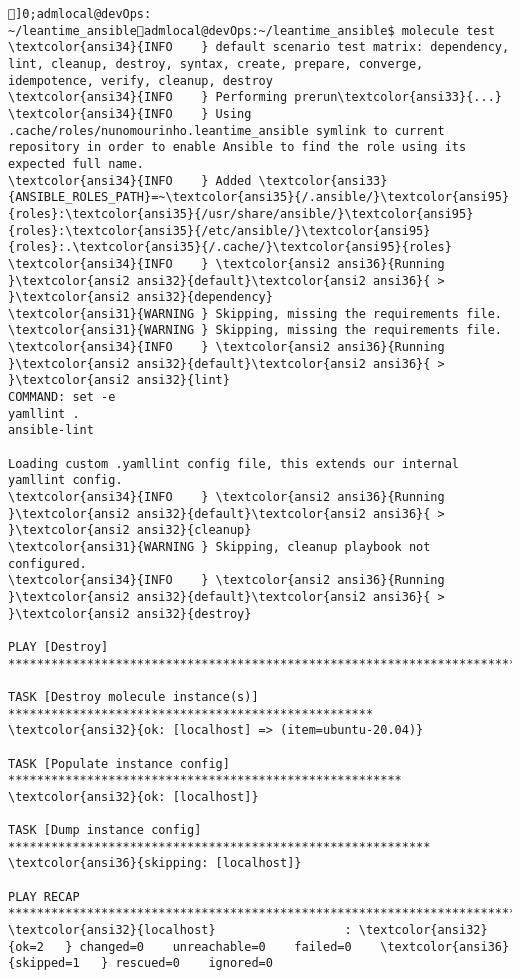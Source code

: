 \documentclass{scrartcl}
\title{}
\begin{document}
\begin{Verbatim}
]0;admlocal@devOps: ~/leantime_ansibleadmlocal@devOps:~/leantime_ansible$ molecule test
\textcolor{ansi34}{INFO    } default scenario test matrix: dependency, lint, cleanup, destroy, syntax, create, prepare, converge, idempotence, verify, cleanup, destroy
\textcolor{ansi34}{INFO    } Performing prerun\textcolor{ansi33}{...}
\textcolor{ansi34}{INFO    } Using .cache/roles/nunomourinho.leantime_ansible symlink to current repository in order to enable Ansible to find the role using its expected full name.
\textcolor{ansi34}{INFO    } Added \textcolor{ansi33}{ANSIBLE_ROLES_PATH}=~\textcolor{ansi35}{/.ansible/}\textcolor{ansi95}{roles}:\textcolor{ansi35}{/usr/share/ansible/}\textcolor{ansi95}{roles}:\textcolor{ansi35}{/etc/ansible/}\textcolor{ansi95}{roles}:.\textcolor{ansi35}{/.cache/}\textcolor{ansi95}{roles}
\textcolor{ansi34}{INFO    } \textcolor{ansi2 ansi36}{Running }\textcolor{ansi2 ansi32}{default}\textcolor{ansi2 ansi36}{ > }\textcolor{ansi2 ansi32}{dependency}
\textcolor{ansi31}{WARNING } Skipping, missing the requirements file.
\textcolor{ansi31}{WARNING } Skipping, missing the requirements file.
\textcolor{ansi34}{INFO    } \textcolor{ansi2 ansi36}{Running }\textcolor{ansi2 ansi32}{default}\textcolor{ansi2 ansi36}{ > }\textcolor{ansi2 ansi32}{lint}
COMMAND: set -e
yamllint .
ansible-lint

Loading custom .yamllint config file, this extends our internal yamllint config.
\textcolor{ansi34}{INFO    } \textcolor{ansi2 ansi36}{Running }\textcolor{ansi2 ansi32}{default}\textcolor{ansi2 ansi36}{ > }\textcolor{ansi2 ansi32}{cleanup}
\textcolor{ansi31}{WARNING } Skipping, cleanup playbook not configured.
\textcolor{ansi34}{INFO    } \textcolor{ansi2 ansi36}{Running }\textcolor{ansi2 ansi32}{default}\textcolor{ansi2 ansi36}{ > }\textcolor{ansi2 ansi32}{destroy}

PLAY [Destroy] ************************************************************************

TASK [Destroy molecule instance(s)] ***************************************************
\textcolor{ansi32}{ok: [localhost] => (item=ubuntu-20.04)}

TASK [Populate instance config] *******************************************************
\textcolor{ansi32}{ok: [localhost]}

TASK [Dump instance config] ***********************************************************
\textcolor{ansi36}{skipping: [localhost]}

PLAY RECAP ****************************************************************************
\textcolor{ansi32}{localhost}                  : \textcolor{ansi32}{ok=2   } changed=0    unreachable=0    failed=0    \textcolor{ansi36}{skipped=1   } rescued=0    ignored=0


\end{Verbatim}
\end{document}

